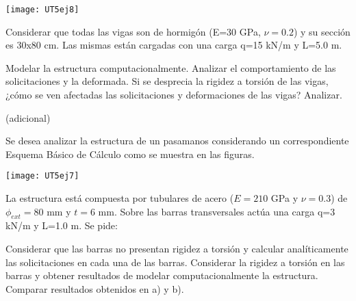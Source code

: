 \begin{center}
	\texttt{[image: UT5ej8]}
\end{center}

Considerar que todas las vigas son de hormigón (E=30 GPa, $\nu=0.2$) y su sección es 30x80 cm. Las mismas están cargadas con una carga q=15 kN/m y L=5.0 m.

\parte Modelar la estructura computacionalmente. Analizar el comportamiento de las solicitaciones y la deformada.
\parte Si se desprecia la rigidez a torsión de las vigas, ¿cómo se ven afectadas las solicitaciones y deformaciones de las vigas? Analizar.




\ejercicio (adicional) 

Se desea analizar la estructura de un pasamanos considerando un correspondiente Esquema Básico de Cálculo como se muestra en las figuras.

\begin{center}
	\texttt{[image: UT5ej7]}
\end{center}

La estructura está compuesta por tubulares de acero ($E=210$ GPa y $\nu=0.3$) de $\phi_{ext}=80$ mm y $t=6$ mm. %
%
Sobre las barras transversales actúa una carga q=3 kN/m y L=1.0 m. Se pide:

\parte Considerar que las barras no presentan rigidez a torsión y calcular analíticamente las solicitaciones en cada una de las barras.
\parte Considerar la rigidez a torsión en las barras y obtener resultados de modelar computacionalmente la estructura.
\parte Comparar resultados obtenidos en a) y b).


%
%
%

